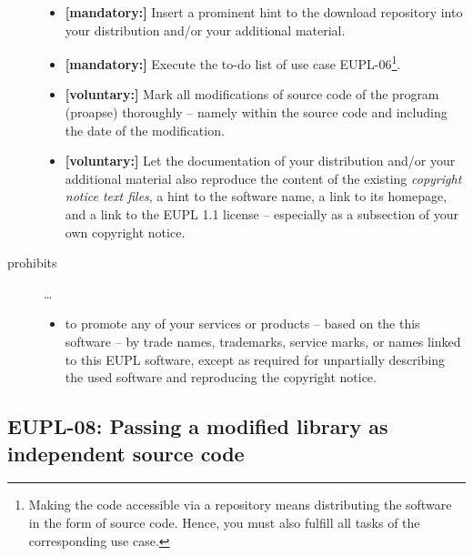 \begin{description}
\begin{itemize}
  \item \textbf{[mandatory:]} Insert a prominent hint to the download repository
  into your distribution and/or your additional material.
    
  \item \textbf{[mandatory:]} Execute the to-do list of use case EUPL-06\footnote{
  Making the code accessible via a repository means distributing the software in
  the form of source code. Hence, you must also fulfill all tasks of the
  corresponding use case.}.
  
  \item \textbf{[voluntary:]} Mark all modifications of source code of the
  program (proapse) thoroughly -- namely within the
  source code and including the date of the modification.
 
  \item \textbf{[voluntary:]} Let the documentation of your distribution and/or
  your additional material  also reproduce the content of the existing
  \emph{copyright notice text files}, a hint to the software name, a link to its
  homepage, and a link to the EUPL 1.1 license -- especially as a subsection of
  your own copyright notice.


\end{itemize}

\item[prohibits] \ldots
\begin{itemize}
  \item to promote any of your services or products -- based on the this software
  -- by trade names, trademarks, service marks, or names linked to this EUPL
  software, except as required for unpartially describing the used software and
  reproducing the copyright notice.
\end{itemize}

\end{description}

\subsection{EUPL-08: Passing a modified library as independent source code}
\label{OSUC-08S-EUPL}

